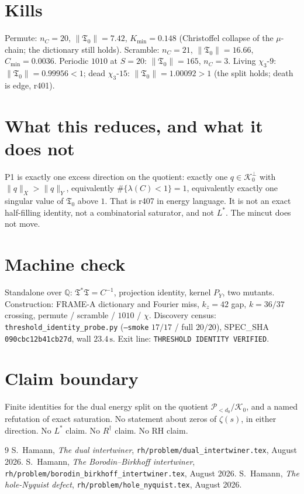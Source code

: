\documentclass[11pt]{article}
\theoremstyle{remark}
\newcommand{\Tfrak}{\mathfrak{T}}
\begin{document}
\section{Kills}

Permute: $n_C=20$, $\|\Tfrak_0\|=7.42$, $K_{\min}=0.148$
(Christoffel collapse of the $\mu$-chain; the dictionary
still holds).
Scramble: $n_C=21$, $\|\Tfrak_0\|=16.66$, $C_{\min}=0.0036$.
Periodic $1010$ at $S=20$: $\|\Tfrak_0\|=165$, $n_C=3$.
Living $\chi_3$-$9$: $\|\Tfrak_0\|=0.99956<1$;
dead $\chi_3$-$15$: $\|\Tfrak_0\|=1.00092>1$
(the split holds; death is edge, r401).

\section{What this reduces, and what it does not}

P1 is exactly one excess direction on the quotient:
exactly one $q\in\mathcal{K}_0^\perp$ with $\|q\|_X>\|q\|_Y$,
equivalently $\#\{\lambda(C)<1\}=1$, equivalently
exactly one singular value of $\Tfrak_0$ above $1$.
That is r407 in energy language.
It is not an exact half-filling identity, not a
combinatorial saturator, and not $L^*$.
The mincut does not move.

\section*{Machine check}

Standalone over $\mathbb{Q}$: $\Tfrak^*\Tfrak=C^{-1}$,
projection identity, kernel $P_Y$, two mutants.
Construction: FRAME-A dictionary and Fourier miss,
$k_z=42$ gap, $k=36/37$ crossing, permute / scramble /
$1010$ / $\chi$.
Discovery census:
\texttt{threshold\_identity\_probe.py}
(\texttt{--smoke} $17/17$ / full $20/20$), SPEC\_SHA
\texttt{090cbc12b41cb27d}, wall $23.4\,\mathrm{s}$.
Exit line: \texttt{THRESHOLD IDENTITY VERIFIED}.

\section*{Claim boundary}

Finite identities for the dual energy split on the
quotient $\mathcal{P}_{<d_0}/\mathcal{K}_0$, and a named
refutation of exact saturation.
No statement about zeros of $\zeta(s)$, in either direction.
No $L^*$ claim.
No $R^\dagger$ claim.
No RH claim.

\begin{thebibliography}{9}
S.~Hamann,
\textit{The dual intertwiner},
\texttt{rh/problem/dual\_intertwiner.tex}, August 2026.
S.~Hamann,
\textit{The Borodin--Birkhoff intertwiner},
\texttt{rh/problem/borodin\_birkhoff\_intertwiner.tex},
August 2026.
S.~Hamann,
\textit{The hole-Nyquist defect},
\texttt{rh/problem/hole\_nyquist.tex}, August 2026.
\end{thebibliography}
\end{document}
